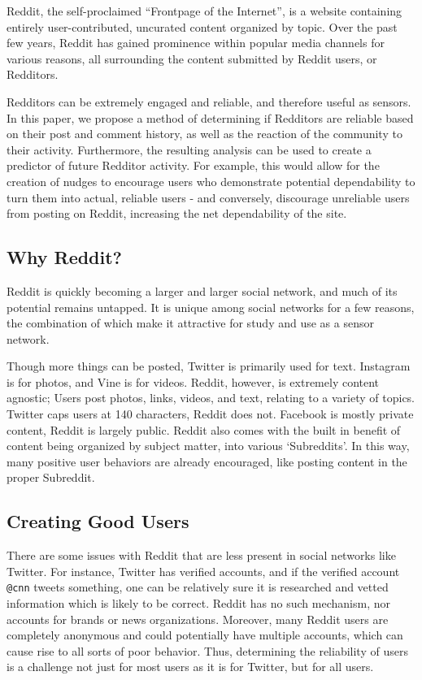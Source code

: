 Reddit, the self-proclaimed ``Frontpage of the Internet'', is a website
containing entirely user-contributed, uncurated content organized by topic. Over
the past few years, Reddit has gained prominence within popular media channels
for various reasons, all surrounding the content submitted by Reddit users, or
Redditors.

Redditors can be extremely engaged and reliable, and therefore useful as
sensors. In this paper, we propose a method of determining if Redditors are
reliable based on their post and comment history, as well as the reaction of the
community to their activity. Furthermore, the resulting analysis can be used to
create a predictor of future Redditor activity. For example, this would allow
for the creation of nudges to encourage users who demonstrate potential
dependability to turn them into actual, reliable users - and conversely,
discourage unreliable users from posting on Reddit, increasing the net
dependability of the site.

\subsection{Why Reddit?}
\label{sub:why_reddit}

Reddit is quickly becoming a larger and larger social network, and much of its
potential remains untapped. It is unique among social networks for a few
reasons, the combination of which make it attractive for study and use as a
sensor network.

Though more things can be posted, Twitter is primarily used for text. Instagram
is for photos, and Vine is for videos. Reddit, however, is extremely content
agnostic; Users post photos, links, videos, and text, relating to a variety of
topics. Twitter caps users at 140 characters, Reddit does not. Facebook is
mostly private content, Reddit is largely public. Reddit also comes with the
built in benefit of content being organized by subject matter, into various
`Subreddits'. In this way, many positive user behaviors are already encouraged,
like posting content in the proper Subreddit.


\subsection{Creating Good Users}
\label{sub:creating_good_users}

There are some issues with Reddit that are less present in social networks like
Twitter. For instance, Twitter has verified accounts, and if the verified
account \texttt{@cnn} tweets something, one can be relatively sure it is
researched and vetted information which is likely to be correct. Reddit has no
such mechanism, nor accounts for brands or news organizations. Moreover, many
Reddit users are completely anonymous and could potentially have multiple
accounts, which can cause rise to all sorts of poor behavior. Thus, determining
the reliability of users is a challenge not just for most users as it is for
Twitter, but for all users.


